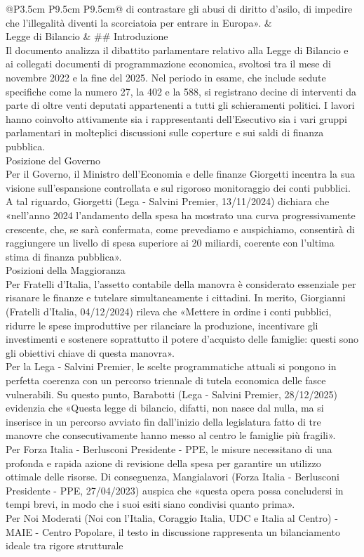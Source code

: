 \documentclass[a4paper,11pt]{article}
\begin{document}
\begin{landscape}
\begin{longtable}{@{}P{3.5cm} P{9.5cm} P{9.5cm}@{}}
di contrastare gli abusi di diritto d'asilo, di impedire che l'illegalità diventi la scorciatoia per entrare in Europa». & \\
\midrule
Legge di Bilancio & \#\# Introduzione\\[6pt] Il documento analizza il dibattito parlamentare relativo alla Legge di Bilancio e ai collegati documenti di programmazione economica, svoltosi tra il mese di novembre 2022 e la fine del 2025. Nel periodo in esame, che include sedute specifiche come la numero 27, la 402 e la 588, si registrano decine di interventi da parte di oltre venti deputati appartenenti a tutti gli schieramenti politici. I lavori hanno coinvolto attivamente sia i rappresentanti dell'Esecutivo sia i vari gruppi parlamentari in molteplici discussioni sulle coperture e sui saldi di finanza pubblica.\\[6pt] Posizione del Governo\\[6pt] Per il Governo, il Ministro dell'Economia e delle finanze Giorgetti incentra la sua visione sull'espansione controllata e sul rigoroso monitoraggio dei conti pubblici. A tal riguardo, Giorgetti (Lega - Salvini Premier, 13/11/2024) dichiara che «nell'anno 2024 l'andamento della spesa ha mostrato una curva progressivamente crescente, che, se sarà confermata, come prevediamo e auspichiamo, consentirà di raggiungere un livello di spesa superiore ai 20 miliardi, coerente con l'ultima stima di finanza pubblica».\\[6pt] Posizioni della Maggioranza\\[6pt] Per Fratelli d'Italia, l'assetto contabile della manovra è considerato essenziale per risanare le finanze e tutelare simultaneamente i cittadini. In merito, Giorgianni (Fratelli d'Italia, 04/12/2024) rileva che «Mettere in ordine i conti pubblici, ridurre le spese improduttive per rilanciare la produzione, incentivare gli investimenti e sostenere soprattutto il potere d'acquisto delle famiglie: questi sono gli obiettivi chiave di questa manovra».\\[6pt] Per la Lega - Salvini Premier, le scelte programmatiche attuali si pongono in perfetta coerenza con un percorso triennale di tutela economica delle fasce vulnerabili. Su questo punto, Barabotti (Lega - Salvini Premier, 28/12/2025) evidenzia che «Questa legge di bilancio, difatti, non nasce dal nulla, ma si inserisce in un percorso avviato fin dall'inizio della legislatura fatto di tre manovre che consecutivamente hanno messo al centro le famiglie più fragili».\\[6pt] Per Forza Italia - Berlusconi Presidente - PPE, le misure necessitano di una profonda e rapida azione di revisione della spesa per garantire un utilizzo ottimale delle risorse. Di conseguenza, Mangialavori (Forza Italia - Berlusconi Presidente - PPE, 27/04/2023) auspica che «questa opera possa concludersi in tempi brevi, in modo che i suoi esiti siano condivisi quanto prima».\\[6pt] Per Noi Moderati (Noi con l'Italia, Coraggio Italia, UDC e Italia al Centro) - MAIE - Centro Popolare, il testo in discussione rappresenta un bilanciamento ideale tra rigore strutturale 
\end{longtable}
\end{landscape}
\end{document}
